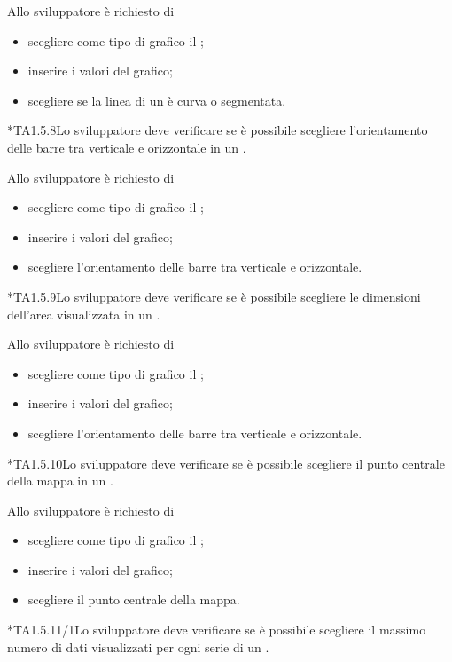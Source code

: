 		Allo sviluppatore è richiesto di
		\begin{itemize}
			\item scegliere come tipo di grafico il ;
			\item inserire i valori del grafico;
			\item scegliere se la linea di un  è curva o segmentata.
		\end{itemize}

	*{TA1.5.8}Lo sviluppatore deve verificare se è possibile scegliere l'orientamento delle barre tra verticale e orizzontale in un .

		Allo sviluppatore è richiesto di
		\begin{itemize}
			\item scegliere come tipo di grafico il ;
			\item inserire i valori del grafico;
			\item scegliere l'orientamento delle barre tra verticale e orizzontale.
		\end{itemize}

	*{TA1.5.9}Lo sviluppatore deve verificare se è possibile scegliere le dimensioni dell'area visualizzata in un .

		Allo sviluppatore è richiesto di
		\begin{itemize}
			\item scegliere come tipo di grafico il ;
			\item inserire i valori del grafico;
			\item scegliere l'orientamento delle barre tra verticale e orizzontale.
		\end{itemize}

	*{TA1.5.10}Lo sviluppatore deve verificare se è possibile scegliere il punto centrale della mappa in un .

		Allo sviluppatore è richiesto di
		\begin{itemize}
			\item scegliere come tipo di grafico il ;
			\item inserire i valori del grafico;
			\item scegliere il punto centrale della mappa.
		\end{itemize}

	*{TA1.5.11/1}Lo sviluppatore deve verificare se è possibile scegliere il massimo numero di dati visualizzati per ogni serie di un .

